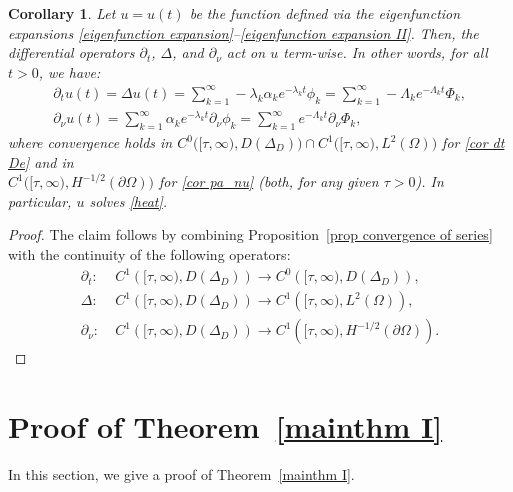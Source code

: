 \documentclass[a4paper,11pt]{article}
\newtheorem{corollary}[theorem]{Corollary}
\numberwithin{equation}{section}
\begin{document}
\begin{corollary}\label{cor termwise whence u solves}
Let $u=u(t)$ be the function defined via the eigenfunction expansions \eqref{eigenfunction expansion}--\eqref{eigenfunction expansion II}. Then, the differential operators $\partial_t$, $\Delta$, and $\partial_\nu$ act on $u$ term-wise. In other words, for all $t>0$, we have:
  \begin{eqnarray}
\partial_t u(t)= \Delta u(t) = \sum_{k=1}^\infty -\lambda_k \alpha_k e^{-\lambda_k t}\phi_k= \sum_{k=1}^\infty -\Lambda_k e^{-\Lambda_k t} \Phi_k, \label{cor dt De}\\
\partial_\nu u(t) = \sum_{k=1}^\infty \alpha_k e^{-\lambda_k t} \partial_\nu \phi_k = \sum_{k=1}^\infty e^{-\Lambda_k t}\partial_\nu \Phi_k, \label{cor pa_nu}
  \end{eqnarray}
where convergence holds in $C^0\big([\tau,\infty), D(\Delta_D)\big) \cap C^1\big([\tau,\infty), L^2(\Omega)\big)$ for \eqref{cor dt De} and in\\
$C^1\big([\tau,\infty), H^{-1/2}(\partial\Omega)\big)$ for \eqref{cor pa_nu}
(both, for any given $\tau>0$). In particular, $u$ solves \eqref{heat}.
\end{corollary}
\begin{proof}
The claim follows by combining Proposition~\ref{prop convergence of series} with the continuity of the following operators:
\begin{equation*}
\begin{aligned}
\partial_t:\;& C^1\left([\tau,\infty), D(\Delta_D)\right) \longrightarrow C^0\left([\tau,\infty), D(\Delta_D)\right),\\  
\Delta:\;& C^1\left([\tau,\infty), D(\Delta_D)\right) \longrightarrow C^1\left([\tau,\infty), L^2(\Omega)\right),\\  
\partial_\nu: \;&C^1\left([\tau,\infty), D(\Delta_D)\right) \longrightarrow C^1\left([\tau,\infty), H^{-1/2}(\partial\Omega)\right).  
\end{aligned}
\end{equation*}
\end{proof}

\section{Proof of Theorem~\ref{mainthm I}}\label{section pf mainthm I}

In this section, we give a proof of Theorem~\ref{mainthm I}. 
\end{document}
